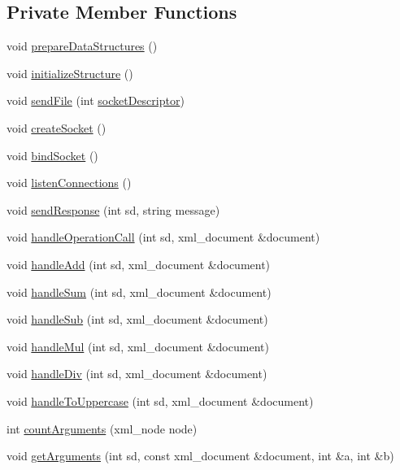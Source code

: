 \subsection*{Private Member Functions}
\begin{DoxyCompactItemize}
\item 
void \mbox{\hyperlink{classServer_a5a4cae5c2975f4f9a655b766f10628dd}{prepare\+Data\+Structures}} ()
\item 
void \mbox{\hyperlink{classServer_abeb8bfed07ed024654d2ca797d99df01}{initialize\+Structure}} ()
\item 
void \mbox{\hyperlink{classServer_af8e4dc8d1a4eff9b99165513e5123d8a}{send\+File}} (int \mbox{\hyperlink{classServer_a5e52b598760882795a7ea0aada7cb9b7}{socket\+Descriptor}})
\item 
void \mbox{\hyperlink{classServer_afa110e18047a3345bca72ed32ca3ce95}{create\+Socket}} ()
\item 
void \mbox{\hyperlink{classServer_a8d86edf1df9f12df07dc6e949d70f77f}{bind\+Socket}} ()
\item 
void \mbox{\hyperlink{classServer_adf63a3e3f481ef8492642ea8746c471b}{listen\+Connections}} ()
\item 
void \mbox{\hyperlink{classServer_a925825ad85f2ee6695d46d479e1a9511}{send\+Response}} (int sd, string message)
\item 
void \mbox{\hyperlink{classServer_ac7681c928d92fa6348356cb7427c3903}{handle\+Operation\+Call}} (int sd, xml\+\_\+document \&document)
\item 
void \mbox{\hyperlink{classServer_a51dd9dc7af2e1ec3e09567360b561697}{handle\+Add}} (int sd, xml\+\_\+document \&document)
\item 
void \mbox{\hyperlink{classServer_abff887eb6a2fc64117b862296a57639d}{handle\+Sum}} (int sd, xml\+\_\+document \&document)
\item 
void \mbox{\hyperlink{classServer_a583c0b2491e947f2612648dafaf55b70}{handle\+Sub}} (int sd, xml\+\_\+document \&document)
\item 
void \mbox{\hyperlink{classServer_aea8043ace02861260e3cc5b9f2cb5e67}{handle\+Mul}} (int sd, xml\+\_\+document \&document)
\item 
void \mbox{\hyperlink{classServer_ae87e0ec97ca193371d707289ecb9492d}{handle\+Div}} (int sd, xml\+\_\+document \&document)
\item 
void \mbox{\hyperlink{classServer_aab98c23345a6c6e19d6f0d723b2261c0}{handle\+To\+Uppercase}} (int sd, xml\+\_\+document \&document)
\item 
int \mbox{\hyperlink{classServer_ad5472ee30f2eb795c29432d3cc7dac15}{count\+Arguments}} (xml\+\_\+node node)
\item 
void \mbox{\hyperlink{classServer_ab841af239c77eeb2ec47e7893d51dfe0}{get\+Arguments}} (int sd, const xml\+\_\+document \&document, int \&a, int \&b)
\end{DoxyCompactItemize}
